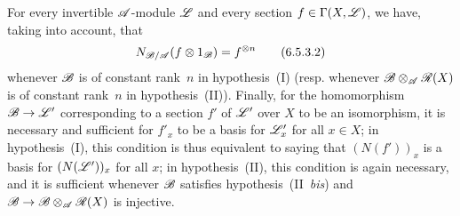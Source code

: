 \begin{env}[6.5.3]
For every invertible $\mathscr{A}$-module $\mathscr{L}$ and every section $f\in\Gamma(X,\mathscr{L})$, we have, taking  into account, that
\[
\label{II.6.5.3.2}
  N_{\mathscr{B}/\mathscr{A}}(f\otimes 1_{\mathscr{B}}) = f^{\otimes n}
\tag{6.5.3.2}
\]
whenever $\mathscr{B}$ is of constant rank~$n$ in hypothesis~(I) (resp. whenever $\mathscr{B}\otimes_{\mathscr{A}}\mathscr{R}(X)$ is of constant rank~$n$ in hypothesis~(II)).
Finally, for the homomorphism $\sh{B}\to\sh{L}'$ corresponding to a section $f'$ of $\mathscr{L}'$ over $X$ to be an isomorphism, it is necessary and sufficient for $f'_x$ to be a basis for $\mathscr{L}'_x$ for all $x\in X$;
in hypothesis~(I), this condition is thus equivalent to saying that $(N(f'))_x$ is a basis for $(N(\mathscr{L}'))_x$ for all $x$;
in hypothesis~(II), this condition is again necessary, and it is sufficient whenever $\mathscr{B}$ satisfies hypothesis~(II~\emph{bis}) and $\sh{B}\to\sh{B}\otimes_{\sh{A}}\sh{R}(X)$ is injective.
\end{env}

